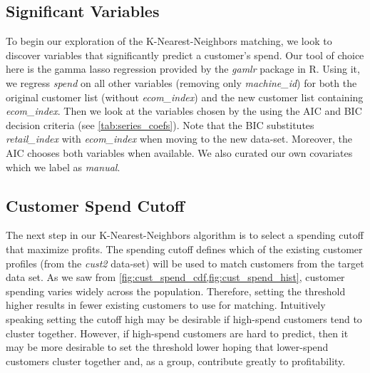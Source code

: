 \subsection{Significant Variables}
To begin our exploration of the K-Nearest-Neighbors matching, we look to discover variables that significantly predict a customer's spend.  Our tool of choice here is the gamma lasso regression provided by the \textit{gamlr} package in R.  Using it, we regress \textit{spend} on all other variables (removing only \textit{machine\_id}) for both the original customer list (without \textit{ecom\_index}) and the new customer list containing \textit{ecom\_index}.  Then we look at the variables chosen by the using the AIC and BIC decision criteria (see \vref{tab:series_coefs}).  Note that the BIC substitutes \textit{retail\_index} with \textit{ecom\_index} when moving to the new data-set.  Moreover, the AIC chooses both variables when available.  We also curated our own covariates which we label as \textit{manual}.



\subsection{Customer Spend Cutoff}
The next step in our K-Nearest-Neighbors algorithm is to select a spending cutoff that maximize profits.  The spending cutoff defines which of the existing customer profiles (from the \textit{cust2} data-set) will be used to match customers from the target data set.  As we saw from \vref{fig:cust_spend_cdf,fig:cust_spend_hist}, customer spending varies widely across the population.  Therefore, setting the threshold higher results in fewer existing customers to use for matching.  Intuitively speaking setting the cutoff high may be desirable if high-spend customers tend to cluster together.  However, if high-spend customers are hard to predict, then it may be more desirable to set the threshold lower hoping that lower-spend customers cluster together and, as a group, contribute greatly to profitability.

